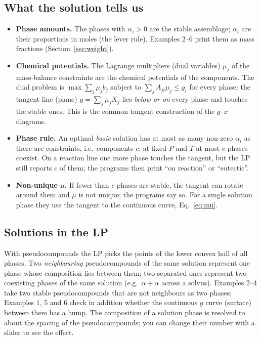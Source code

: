 \documentclass[11pt,a4paper]{article}
\begin{document}
\subsection{What the solution tells us}
\begin{itemize}
\item \textbf{Phase amounts.} The phases with $\alpha_i > 0$ are the stable assemblage; $\alpha_i$ are their
  proportions in moles (the lever rule). Examples 2–6 print them as mass fractions (Section~\ref{sec:weight}).
\item \textbf{Chemical potentials.} The Lagrange multipliers (dual variables) $\mu_j$ of the mass-balance
  constraints are the chemical potentials of the components. The dual problem is
  $\max \sum_j \mu_j b_j$ subject to $\sum_j A_{ji}\mu_j \le g_i$ for every phase: the tangent line (plane)
  $g = \sum_j \mu_j X_j$ lies \emph{below or on} every phase and touches the stable ones. This is the common
  tangent construction of the $g$–$x$ diagrams.
\item \textbf{Phase rule.} An optimal \emph{basic} solution has at most as many non-zero $\alpha_i$ as there are
  constraints, i.e.\ components $c$: at fixed $P$ and $T$ at most $c$ phases coexist. On a reaction line one
  more phase touches the tangent, but the LP still reports $c$ of them; the programs then print
  ``on reaction'' or ``eutectic''.
\item \textbf{Non-unique $\mu$.} If fewer than $c$ phases are stable, the tangent can rotate around them and $\mu$
  is not unique; the programs say so. For a single solution phase they use the tangent to the continuous
  curve, Eq.~\eqref{eq:mu}.
\end{itemize}

\subsection{Solutions in the LP}
With pseudocompounds the LP picks the points of the lower convex hull of all phases. Two \emph{neighbouring}
pseudocompounds of the same solution represent one phase whose composition lies between them; two
separated ones represent two coexisting phases of the same solution (e.g.\ $\alpha + \alpha$ across a
solvus). Examples 2–4 take two stable pseudocompounds that are not neighbours as two phases; Examples 1,
5 and 6 check in addition whether the continuous $g$ curve (surface) between them has a hump.
The composition of a solution phase is resolved to about the spacing of the pseudocompounds; you can change
their number with a slider to see the effect.
\end{document}

